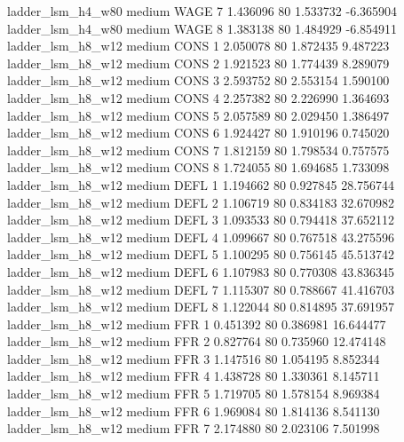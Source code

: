   ladder_lsm_h4_w80     medium     WAGE                 7  1.436096 80       1.533732          -6.365904
  ladder_lsm_h4_w80     medium     WAGE                 8  1.383138 80       1.484929          -6.854911
  ladder_lsm_h8_w12     medium     CONS                 1  2.050078 80       1.872435           9.487223
  ladder_lsm_h8_w12     medium     CONS                 2  1.921523 80       1.774439           8.289079
  ladder_lsm_h8_w12     medium     CONS                 3  2.593752 80       2.553154           1.590100
  ladder_lsm_h8_w12     medium     CONS                 4  2.257382 80       2.226990           1.364693
  ladder_lsm_h8_w12     medium     CONS                 5  2.057589 80       2.029450           1.386497
  ladder_lsm_h8_w12     medium     CONS                 6  1.924427 80       1.910196           0.745020
  ladder_lsm_h8_w12     medium     CONS                 7  1.812159 80       1.798534           0.757575
  ladder_lsm_h8_w12     medium     CONS                 8  1.724055 80       1.694685           1.733098
  ladder_lsm_h8_w12     medium     DEFL                 1  1.194662 80       0.927845          28.756744
  ladder_lsm_h8_w12     medium     DEFL                 2  1.106719 80       0.834183          32.670982
  ladder_lsm_h8_w12     medium     DEFL                 3  1.093533 80       0.794418          37.652112
  ladder_lsm_h8_w12     medium     DEFL                 4  1.099667 80       0.767518          43.275596
  ladder_lsm_h8_w12     medium     DEFL                 5  1.100295 80       0.756145          45.513742
  ladder_lsm_h8_w12     medium     DEFL                 6  1.107983 80       0.770308          43.836345
  ladder_lsm_h8_w12     medium     DEFL                 7  1.115307 80       0.788667          41.416703
  ladder_lsm_h8_w12     medium     DEFL                 8  1.122044 80       0.814895          37.691957
  ladder_lsm_h8_w12     medium      FFR                 1  0.451392 80       0.386981          16.644477
  ladder_lsm_h8_w12     medium      FFR                 2  0.827764 80       0.735960          12.474148
  ladder_lsm_h8_w12     medium      FFR                 3  1.147516 80       1.054195           8.852344
  ladder_lsm_h8_w12     medium      FFR                 4  1.438728 80       1.330361           8.145711
  ladder_lsm_h8_w12     medium      FFR                 5  1.719705 80       1.578154           8.969384
  ladder_lsm_h8_w12     medium      FFR                 6  1.969084 80       1.814136           8.541130
  ladder_lsm_h8_w12     medium      FFR                 7  2.174880 80       2.023106           7.501998
